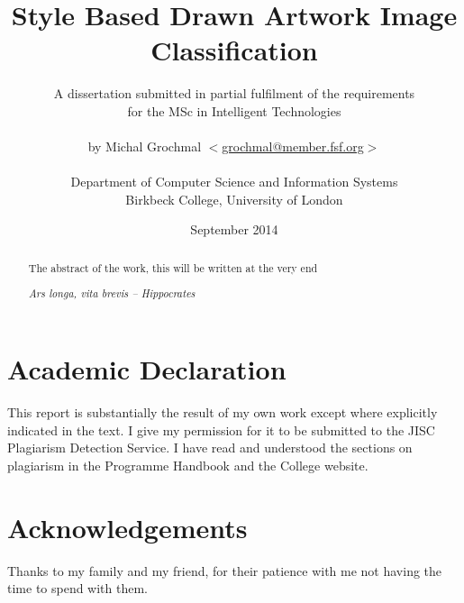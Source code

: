 \documentclass[11pt,a4paper,draft]{report}
\title{Style Based Drawn Artwork Image Classification}
\author{A dissertation submitted in partial fulfilment of the requirements\\
  for the MSc in Intelligent Technologies\\
  \\
  by Michal Grochmal
  $<$\href{mailto:grochmal@member.fsf.org}{grochmal@member.fsf.org}$>$\\
  \\
  Department of Computer Science and Information Systems\\
  Birkbeck College, University of London
}
\date{September 2014}
\begin{document}
\VerbatimFootnotes
\maketitle

\newpage
\null
\thispagestyle{empty}
\newpage

\pagestyle{fancy}
\lhead{}
\rhead{}

\begin{abstract}

The abstract of the work, this will be written at the very end

\begin{flushright}
\emph{Ars longa, vita brevis -- Hippocrates}
\end{flushright}
\end{abstract}

\newpage
\null
\thispagestyle{empty}
\newpage

\newpage
{}
{}
\setcounter{page}{1}
\tableofcontents

\newpage
{}
{}
\listoffigures

\newpage
{}
{}
\listoftables

\newpage
{}
{}
\chapter*{Academic Declaration}
This report is substantially the result of my own work except where explicitly
indicated in the text.  I give my permission for it to be submitted to the JISC
Plagiarism Detection Service.  I have read and understood the sections on
plagiarism in the Programme Handbook and the College website.

\newpage
{}
{}
\chapter*{Acknowledgements}
Thanks to my family and my friend, for their patience with me not having the
time to spend with them.

\newpage
\setcounter{page}{1}
\end{document}
